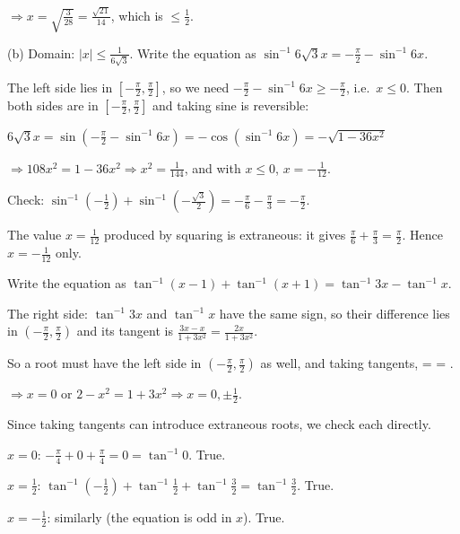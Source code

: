   $\Rightarrow x = \sqrt{\frac{3}{28}} = \frac{\sqrt{21}}{14}$, which is $\le\frac{1}{2}$.

  (b) Domain: $|x|\le\frac{1}{6\sqrt{3}}$. Write the equation as $\sin^{-1}6\sqrt{3}x = -\frac{\pi}{2} -
  \sin^{-1}6x$.

  The left side lies in $\left[-\frac{\pi}{2}, \frac{\pi}{2}\right]$, so we need $-\frac{\pi}{2} - \sin^{-1}6x\ge
  -\frac{\pi}{2}$, i.e.\ $x\le 0$. Then both sides are in $\left[-\frac{\pi}{2}, \frac{\pi}{2}\right]$ and taking
  sine is reversible:

  $6\sqrt{3}x = \sin\left(-\frac{\pi}{2} - \sin^{-1}6x\right) = -\cos\left(\sin^{-1}6x\right) = -\sqrt{1 - 36x^2}$

  $\Rightarrow 108x^2 = 1 - 36x^2\Rightarrow x^2 = \frac{1}{144}$, and with $x\le 0$, $x = -\frac{1}{12}$.

  Check: $\sin^{-1}\left(-\frac{1}{2}\right) + \sin^{-1}\left(-\frac{\sqrt{3}}{2}\right) = -\frac{\pi}{6} -
  \frac{\pi}{3} = -\frac{\pi}{2}$.

  The value $x = \frac{1}{12}$ produced by squaring is extraneous: it gives $\frac{\pi}{6} + \frac{\pi}{3} =
  \frac{\pi}{2}$. Hence $x = -\frac{1}{12}$ only.
\item Write the equation as $\tan^{-1}(x - 1) + \tan^{-1}(x + 1) = \tan^{-1}3x - \tan^{-1}x$.

  The right side: $\tan^{-1}3x$ and $\tan^{-1}x$ have the same sign, so their difference lies in
  $\left(-\frac{\pi}{2}, \frac{\pi}{2}\right)$ and its tangent is $\frac{3x - x}{1 + 3x^2} = \frac{2x}{1 + 3x^2}$.

  So a root must have the left side in $\left(-\frac{\pi}{2}, \frac{\pi}{2}\right)$ as well, and taking tangents,
  \startformula
     = \Rightarrow{} = .
  \stopformula

  $\Rightarrow x = 0$ or $2 - x^2 = 1 + 3x^2\Rightarrow x = 0, \pm\frac{1}{2}$.

  Since taking tangents can introduce extraneous roots, we check each directly.

  $x = 0$: $-\frac{\pi}{4} + 0 + \frac{\pi}{4} = 0 = \tan^{-1}0$. True.

  $x = \frac{1}{2}$: $\tan^{-1}\left(-\frac{1}{2}\right) + \tan^{-1}\frac{1}{2} + \tan^{-1}\frac{3}{2} =
  \tan^{-1}\frac{3}{2}$. True.

  $x = -\frac{1}{2}$: similarly (the equation is odd in $x$). True.

